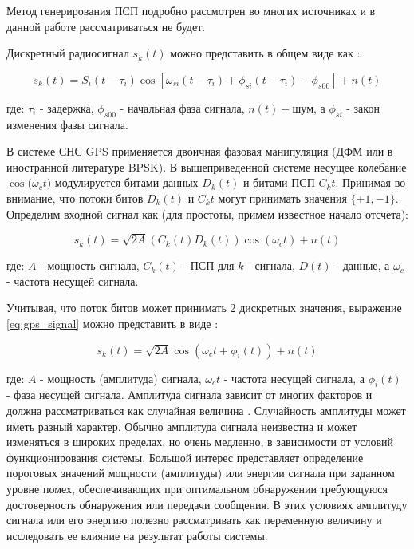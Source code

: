 Метод генерирования ПСП подробно рассмотрен во многих источниках \cite{tsui, akos-book, kaplan}
и в данной работе рассматриваться не будет.

Дискретный радиосигнал $s_k(t)$ можно представить в общем виде как \cite{pestryakov-book}:
\begin{center}
\begin{equation}
	\label{eq:model_signal}
	s_k(t) = S_i(t - \tau_{i})\cos[\omega_{si}(t - \tau_{i}) + \phi_{si}(t - \tau_{i}) - \phi_{s00}] + n(t)
\end{equation}
\end{center}
где: ${\tau_i}$ - задержка, ${\phi_{s00}}$ - начальная фаза сигнала, ${n(t)} - шум$,
а ${\phi_{si}}$ - закон изменения фазы сигнала.

В системе СНС GPS применяется двоичная фазовая манипуляция (ДФМ или в иностранной литературе BPSK).
В вышеприведенной системе несущее колебание ${\cos(\omega_{c}t})$ модулируется битами данных ${D_k(t)}$ и битами ПСП
${C_k{t}}$. Принимая во внимание, что потоки битов ${D_k(t)}$ и ${C_k{t}}$ могут принимать значения
${\{+1, -1\}}$. Определим входной сигнал как (для простоты, примем известное начало отсчета):

\begin{center}
\begin{equation}
	\label{eq:gps_signal}
	s_k(t) = \sqrt{2A}(C_k(t)D_k(t))\cos(\omega_{c}t) + n(t)
\end{equation}
\end{center}
где: ${A}$ - мощность сигнала, ${C_k(t)}$ - ПСП для ${k}$ - сигнала, ${D(t)}$ - данные, а ${\omega_{c}}$ - частота несущей сигнала.

Учитывая, что поток битов может принимать 2 дискретных значения, выражение \ref{eq:gps_signal} можно представить в виде \cite{sklyar}:
\begin{center}
\begin{equation}
	\label{eq:gps_signal_phase}
	s_k(t) = \sqrt{2A}\cos(\omega_{c}t + \phi_{i}(t)) + n(t)
\end{equation}
\end{center}
где: ${A}$ - мощность (амплитуда) сигнала, ${\omega_{c}t}$ - частота несущей сигнала, а ${\phi_{i}(t)}$ - фаза несущей сигнала.
Амплитуда сигнала зависит от многих факторов и должна рассматриваться как случайная величина \cite{pestryakov-book}. Случайность
амплитуды может иметь разный характер. Обычно амплитуда сигнала неизвестна и может изменяться в широких пределах,
но очень медленно, в зависимости от условий функционирования системы. Большой интерес представляет определение пороговых
значений мощности (амплитуды) или энергии сигнала при заданном уровне помех, обеспечивающих при оптимальном
обнаружении требующуюся достоверность обнаружения или передачи сообщения. В этих условиях амплитуду сигнала или его энергию
полезно рассматривать как переменную величину и исследовать ее влияние на результат работы системы.

